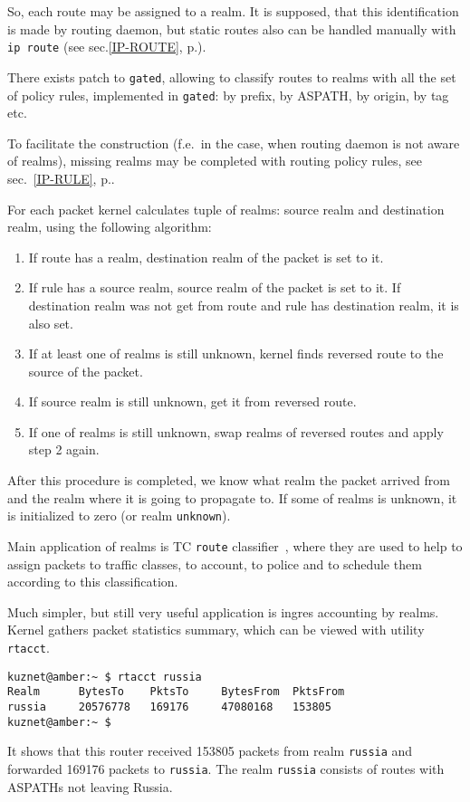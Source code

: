 So, each route may be assigned to a realm. It is supposed, that
this identification is made by routing daemon, but static routes
also can be handled manually with \verb|ip route| (see sec.\ref{IP-ROUTE},
p.\pageref{IP-ROUTE}).
\begin{NB}
  There exists patch to \verb|gated|, allowing to classify routes
  to realms with all the set of policy rules, implemented in \verb|gated|:
  by prefix, by ASPATH, by origin, by tag etc.
\end{NB}

To facilitate the construction (f.e.\ in the case, when routing
daemon is not aware of realms), missing realms may be completed
with routing policy rules, see sec.~\ref{IP-RULE}, p.\pageref{IP-RULE}.

For each packet kernel calculates tuple of realms: source realm
and destination realm, using the following algorithm:

\begin{enumerate}
\item If route has a realm, destination realm of the packet is set to it.
\item If rule has a source realm, source realm of the packet is set to it.
If destination realm was not get from route and rule has destination realm,
it is also set.
\item If at least one of realms is still unknown, kernel finds
reversed route to the source of the packet.
\item If source realm is still unknown, get it from reversed route.
\item If one of realms is still unknown, swap realms of reversed
routes and apply step 2 again.
\end{enumerate}

After this procedure is completed, we know what realm the packet
arrived from and the realm where it is going to propagate to.
If some of realms is unknown, it is initialized to zero
(or realm \verb|unknown|).

Main application of realms is TC \verb|route| classifier~\cite{TC-CREF},
where they are used to help to assign packets to traffic classes,
to account, to police and to schedule them according to this
classification.

Much simpler, but still very useful application is ingres
accounting by realms. Kernel gathers packet statistics summary,
which can be viewed with utility \verb|rtacct|.
\begin{verbatim}
kuznet@amber:~ $ rtacct russia
Realm      BytesTo    PktsTo     BytesFrom  PktsFrom   
russia     20576778   169176     47080168   153805     
kuznet@amber:~ $
\end{verbatim}
It shows that this router received 153805 packets from
realm \verb|russia| and forwarded 169176 packets to \verb|russia|.
The realm \verb|russia| consists of routes with ASPATHs not leaving
Russia.

